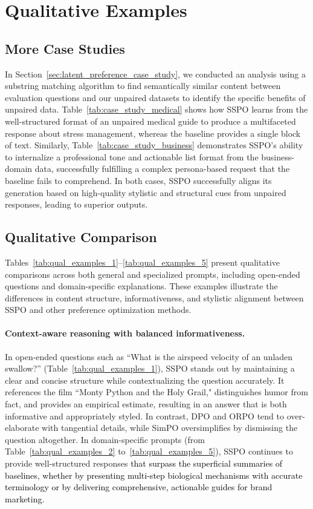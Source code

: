 \documentclass{article} %
\newcommand\fix[1]{\textcolor{black}{#1}}
\begin{document}
\newpage
\section{Qualitative Examples}

\subsection{More Case Studies}
\label{appendix:more_case_studies}

In Section~\ref{sec:latent_preference_case_study}, we conducted an analysis using a substring matching algorithm to find semantically similar content between evaluation questions and our unpaired datasets to identify the specific benefits of unpaired data. Table~\ref{tab:case_study_medical} shows how SSPO learns from the well-structured format of an unpaired medical guide to produce a multifaceted response about stress management, whereas the baseline provides a single block of text. Similarly, Table~\ref{tab:case_study_business} demonstrates SSPO's ability to internalize a professional tone and actionable list format from the business-domain data, successfully fulfilling a complex persona-based request that the baseline fails to comprehend. In both cases, SSPO successfully aligns its generation based on high-quality stylistic and structural cues from unpaired responses, leading to superior outputs.

\subsection{Qualitative Comparison}
\label{appendix:qualitative_comparison}

Tables~\ref{tab:qual_examples_1}--\ref{tab:qual_examples_5} present qualitative comparisons across both general and specialized prompts, including open-ended questions and domain-specific explanations. These examples illustrate the differences in content structure, informativeness, and stylistic alignment between SSPO and other preference optimization methods.

\paragraph{Context-aware reasoning with balanced informativeness.}
In open-ended questions such as “What is the airspeed velocity of an unladen swallow?” (Table~\ref{tab:qual_examples_1}), SSPO stands out by maintaining a clear and concise structure while contextualizing the question accurately. It references the film ``Monty Python and the Holy Grail," distinguishes humor from fact, and provides an empirical estimate, resulting in an answer that is both informative and appropriately styled. In contrast, DPO and ORPO tend to over-elaborate with tangential details, while SimPO oversimplifies by dismissing the question altogether. In domain-specific prompts (from Table~\ref{tab:qual_examples_2} to~\ref{tab:qual_examples_5}), SSPO continues to provide well-structured responses \fix{that surpass the superficial summaries of baselines, whether by presenting multi-step biological mechanisms with accurate terminology or by delivering comprehensive, actionable guides for brand marketing.}
\end{document}
